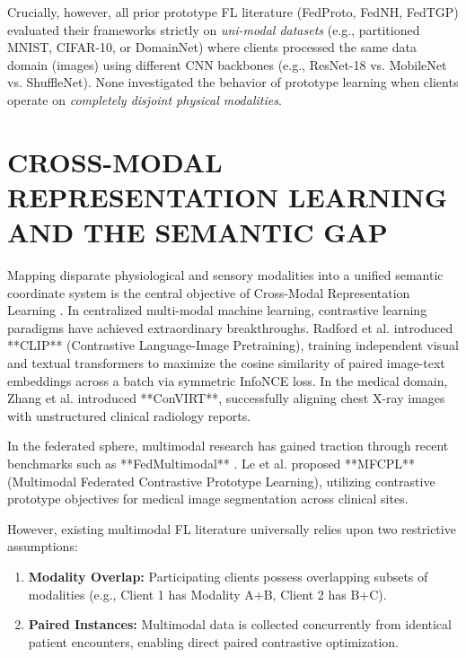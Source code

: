 \documentclass[12pt,a4paper]{amritareport}
\begin{document}
Crucially, however, all prior prototype FL literature (FedProto, FedNH, FedTGP) evaluated their frameworks strictly on \textit{uni-modal datasets} (e.g., partitioned MNIST, CIFAR-10, or DomainNet) where clients processed the same data domain (images) using different CNN backbones (e.g., ResNet-18 vs. MobileNet vs. ShuffleNet). None investigated the behavior of prototype learning when clients operate on \textit{completely disjoint physical modalities}.


\section{CROSS-MODAL REPRESENTATION LEARNING AND THE SEMANTIC GAP}

Mapping disparate physiological and sensory modalities into a unified semantic coordinate system is the central objective of Cross-Modal Representation Learning \cite{baltruvsaitis2018multimodal}. In centralized multi-modal machine learning, contrastive learning paradigms have achieved extraordinary breakthroughs. Radford et al. \cite{radford2021learning} introduced **CLIP** (Contrastive Language-Image Pretraining), training independent visual and textual transformers to maximize the cosine similarity of paired image-text embeddings across a batch via symmetric InfoNCE loss. In the medical domain, Zhang et al. \cite{zhang2022contrastive} introduced **ConVIRT**, successfully aligning chest X-ray images with unstructured clinical radiology reports.

In the federated sphere, multimodal research has gained traction through recent benchmarks such as **FedMultimodal** \cite{feng2023fedmultimodal}. Le et al. \cite{le2024multimodal} proposed **MFCPL** (Multimodal Federated Contrastive Prototype Learning), utilizing contrastive prototype objectives for medical image segmentation across clinical sites. 

However, existing multimodal FL literature universally relies upon two restrictive assumptions:
\begin{enumerate}
	\item \textbf{Modality Overlap:} Participating clients possess overlapping subsets of modalities (e.g., Client 1 has Modality A+B, Client 2 has B+C).
	\item \textbf{Paired Instances:} Multimodal data is collected concurrently from identical patient encounters, enabling direct paired contrastive optimization.
\end{enumerate}
\end{document}
